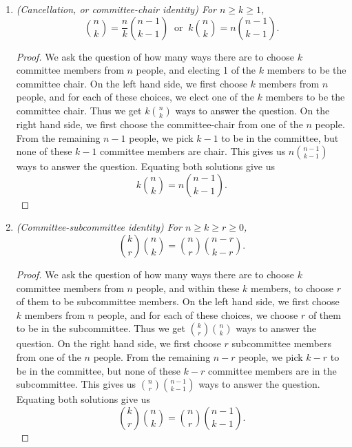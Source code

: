 \documentclass{article}
\begin{document}
\begin{enumerate}[label={\bf Q\arabic*:}]
    \begin{proof}
      \begin{align*}
        \binom{n+m+1}{n} &=\binom{n+m+1}{m+1} &(\text{symmetry identity}) \\
        &=\binom{m}{m}+\binom{m+1}{m}+\ldots+\binom{m+n}{m} &(\text{
          upper summation identity}) \\
        &=\binom{m}{0}+\binom{m+1}{1}+\ldots+\binom{m+n}{n} &(\text{
          symmetry identity}) \\
        &=\sum_{k=0}^n\binom{m+k}{k}.
      \end{align*}
    \end{proof}

  \item \it (Cancellation, or committee-chair identity) For $n\geq k\geq1$,
    \[\binom{n}{k} =\frac{n}{k}\binom{n-1}{k-1}\;\; \text{or}\;\;
    k\binom{n}{k}=n\binom{n-1}{k-1}.\]

    \begin{proof}
      We ask the question of how many ways there are to choose $k$
      committee members from $n$ people, and electing 1 of the $k$ members
      to be the committee chair. On the left hand side, we first choose $k$
      members from $n$ people, and for each of these choices, we elect
      one of the $k$ members to be the committee chair. Thus we get
      $k\binom{n}{k}$ ways to answer the question. On the right hand side,
      we first choose the committee-chair from one of the $n$ people. From
      the remaining $n-1$ people, we pick $k-1$ to be in the committee, but
      none of these $k-1$ committee members are chair. This gives us
      $n\binom{n-1}{k-1}$ ways to answer the question. Equating both
      solutions give us
      \[k\binom{n}{k}=n\binom{n-1}{k-1}.\]
    \end{proof}

  \item \it (Committee-subcommittee identity) For $n\geq k\geq r\geq0$,
    \[\binom{k}{r}\binom{n}{k} = \binom{n}{r}\binom{n-r}{k-r}.\]

    \begin{proof}
      We ask the question of how many ways there are to choose $k$
      committee members from $n$ people, and within these $k$ members, to
      choose $r$ of them to be subcommittee members. On the left hand
      side, we first choose $k$ members from $n$ people, and for each of
      these choices, we choose $r$ of them to be in the subcommittee.
      Thus we get $\binom{k}{r}\binom{n}{k}$ ways to answer the
      question. On the right hand side, we first choose $r$ subcommittee
      members from one of the $n$ people. From the remaining $n-r$ people,
      we pick $k-r$ to be in the committee, but none of these $k-r$
      committee members are in the subcommittee. This gives us
      $\binom{n}{r}\binom{n-1}{k-1}$ ways to answer the question. Equating
      both solutions give us
      \[\binom{k}{r}\binom{n}{k}=\binom{n}{r}\binom{n-1}{k-1}.\]
    \end{proof}
\end{enumerate}
\end{document}
